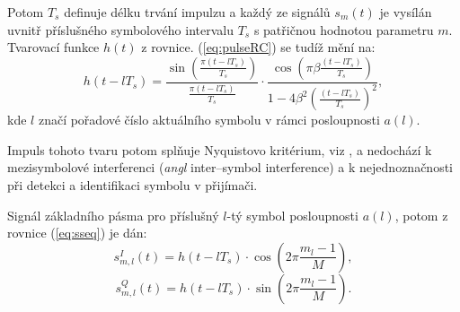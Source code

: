 Potom $T_s$ definuje délku trvání impulzu a každý ze signálů $s_m(t)$ je vysílán uvnitř příslušného symbolového intervalu $T_s$ s patřičnou hodnotou parametru $m$. Tvarovací funkce  $h(t)$ z rovnice. (\ref{eq:pulseRC}) se tudíž mění na:
 \begin{equation}
 h(t-lT_s) =  \frac{\sin(\frac{\pi (t-lT_s)}{T_s})}{\frac{\pi (t-lT_s)}{T_s}}\cdot \frac{\cos(\pi \beta \frac{(t-lT_s)}{T_s})}{1-4 \beta^2 (\frac{(t-lT_s)}{T_s})^2}, \label{eq:pulseRCTs}
\end{equation}
kde $l$ značí pořadové číslo aktuálního symbolu v rámci posloupnosti $a(l)$.

Impuls tohoto tvaru potom splňuje Nyquistovo kritérium, viz \cite{proakis2007}, a nedochází k mezisymbolové interferenci (\textsl{angl} inter--symbol interference) a k nejednoznačnosti při detekci a identifikaci symbolu v přijímači.

Signál základního pásma pro příslušný $l$-tý symbol posloupnosti $a(l)$, potom z rovnice (\ref{eq:sseq}) je dán: 
\begin{equation}
 s_{m,l}^I(t) = h(t-lT_s) \cdot \cos(2\pi \frac{m_l-1}{M}), \label{eq:sigBBI}
\end{equation}
\begin{equation}
 s_{m,l}^Q(t) = h(t-lT_s) \cdot \sin(2\pi \frac{m_l-1}{M}). \label{eq:sigBBQ}
\end{equation}



